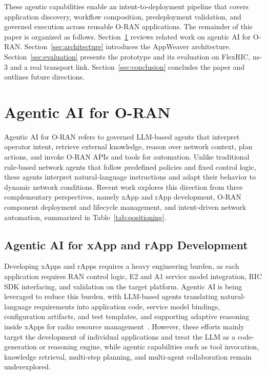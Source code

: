 \documentclass[conference]{IEEEtran}
\begin{document}
These agentic capabilities enable an intent-to-deployment pipeline that covers application discovery, workflow composition, predeployment validation, and governed execution across reusable O-RAN applications.
The remainder of this paper is organized as follows. Section~\ref{sec:background} reviews related work on agentic AI for O-RAN. Section~\ref{sec:architecture} introduces the AppWeaver architecture. Section~\ref{sec:evaluation} presents the prototype and its evaluation on FlexRIC, ns-3 and a real transport link. Section~\ref{sec:conclusion} concludes the paper and outlines future directions.

\section{Agentic AI for O-RAN}\label{sec:background}
Agentic AI for O-RAN refers to governed LLM-based agents that interpret operator intent, retrieve external knowledge, reason over network context, plan actions, and invoke O-RAN APIs and tools for automation. Unlike traditional rule-based network agents that follow predefined policies and fixed control logic, these agents interpret natural-language instructions and adapt their behavior to dynamic network conditions. Recent work explores this direction from three complementary perspectives, namely xApp and rApp development, O-RAN component deployment and lifecycle management, and intent-driven network automation, summarized in Table~\ref{tab:positioning}.


\subsection{Agentic AI for xApp and rApp Development}
Developing xApps and rApps requires a heavy engineering burden, as each application requires RAN control logic, E2 and A1 service model integration, RIC SDK interfacing, and validation on the target platform. Agentic AI is being leveraged to reduce this burden, with LLM-based agents translating natural-language requirements into application code, service model bindings, configuration artifacts, and test templates, and supporting adaptive reasoning inside xApps for radio resource management~\cite{maatouk2024large}. However, these efforts mainly target the development of individual applications and treat the LLM as a code-generation or reasoning engine, while agentic capabilities such as tool invocation, knowledge retrieval, multi-step planning, and multi-agent collaboration remain underexplored.
\end{document}
